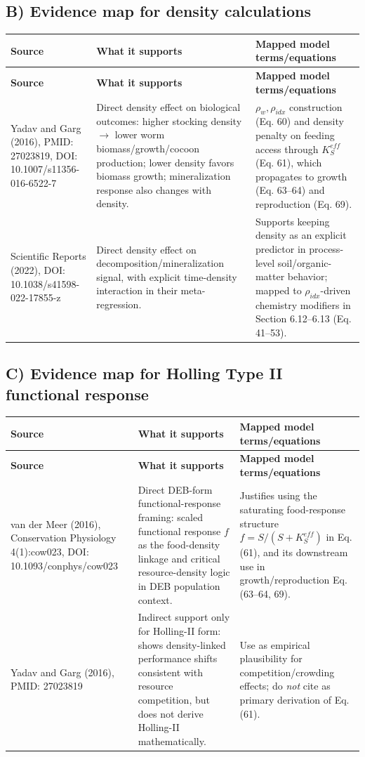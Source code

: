 \documentclass[11pt]{article}
\begin{document}
\subsection*{B) Evidence map for density calculations}
\begin{longtable}{p{}p{}p{}}
\toprule
\textbf{Source} & \textbf{What it supports} & \textbf{Mapped model terms/equations} \\
\midrule
\endfirsthead
\toprule
\textbf{Source} & \textbf{What it supports} & \textbf{Mapped model terms/equations} \\
\midrule
\endhead
Yadav and Garg (2016), PMID: 27023819, DOI: 10.1007/s11356-016-6522-7 &
Direct density effect on biological outcomes:
higher stocking density \(\rightarrow\) lower worm biomass/growth/cocoon production; lower density favors biomass growth; mineralization response also changes with density. &
\(\rho_w,\rho_{idx}\) construction (Eq. 60) and density penalty on feeding access through \(K_S^{eff}\) (Eq. 61), which propagates to growth (Eq. 63--64) and reproduction (Eq. 69). \\

Scientific Reports (2022), DOI: 10.1038/s41598-022-17855-z &
Direct density effect on decomposition/mineralization signal, with explicit time-density interaction in their meta-regression. &
Supports keeping density as an explicit predictor in process-level soil/organic-matter behavior; mapped to \(\rho_{idx}\)-driven chemistry modifiers in Section 6.12--6.13 (Eq. 41--53). \\
\bottomrule
\end{longtable}

\subsection*{C) Evidence map for Holling Type II functional response}
\begin{longtable}{p{}p{}p{}}
\toprule
\textbf{Source} & \textbf{What it supports} & \textbf{Mapped model terms/equations} \\
\midrule
\endfirsthead
\toprule
\textbf{Source} & \textbf{What it supports} & \textbf{Mapped model terms/equations} \\
\midrule
\endhead
van der Meer (2016), Conservation Physiology 4(1):cow023, DOI: 10.1093/conphys/cow023 &
Direct DEB-form functional-response framing: scaled functional response \(f\) as the food-density linkage and critical resource-density logic in DEB population context. &
Justifies using the saturating food-response structure
\(f=S/(S+K_S^{eff})\) in Eq. (61), and its downstream use in growth/reproduction Eq. (63--64, 69). \\

Yadav and Garg (2016), PMID: 27023819 &
Indirect support only for Holling-II form: shows density-linked performance shifts consistent with resource competition, but does not derive Holling-II mathematically. &
Use as empirical plausibility for competition/crowding effects; do \emph{not} cite as primary derivation of Eq. (61). \\
\bottomrule
\end{longtable}
\end{document}
